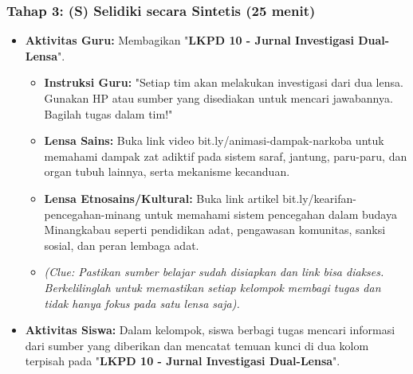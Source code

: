 \documentclass[a4paper,12pt]{article}
\begin{document}
\subsubsection{Tahap 3: (S) Selidiki secara Sintetis (25 menit)}
\begin{itemize}
\item \textbf{Aktivitas Guru:} Membagikan "\textbf{LKPD 10 - Jurnal Investigasi Dual-Lensa}".
    \begin{itemize}
    \item \textbf{Instruksi Guru:} "Setiap tim akan melakukan investigasi dari dua lensa. Gunakan HP atau sumber yang disediakan untuk mencari jawabannya. Bagilah tugas dalam tim!"
    \item \textbf{Lensa Sains:} Buka link video bit.ly/animasi-dampak-narkoba untuk memahami dampak zat adiktif pada sistem saraf, jantung, paru-paru, dan organ tubuh lainnya, serta mekanisme kecanduan.
    \item \textbf{Lensa Etnosains/Kultural:} Buka link artikel bit.ly/kearifan-pencegahan-minang untuk memahami sistem pencegahan dalam budaya Minangkabau seperti pendidikan adat, pengawasan komunitas, sanksi sosial, dan peran lembaga adat.
    \item \textit{(Clue: Pastikan sumber belajar sudah disiapkan dan link bisa diakses. Berkelilinglah untuk memastikan setiap kelompok membagi tugas dan tidak hanya fokus pada satu lensa saja).}
    \end{itemize}
\item \textbf{Aktivitas Siswa:} Dalam kelompok, siswa berbagi tugas mencari informasi dari sumber yang diberikan dan mencatat temuan kunci di dua kolom terpisah pada "\textbf{LKPD 10 - Jurnal Investigasi Dual-Lensa}".
\end{itemize}
\end{document}
